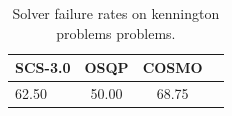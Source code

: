 \begin{table}
\centering
\caption{Solver failure rates on kennington problems problems.}
\label{t-kennington problems-failure}
\begin{tabular}{lccc}
\toprule
 SCS-3.0 &  OSQP &  COSMO \\
\midrule
   62.50 & 50.00 &  68.75 \\
\bottomrule
\end{tabular}
\end{table}

